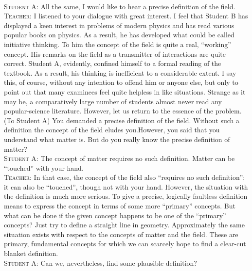 \documentclass[a4paper,sfsidenotes]{tufte-book}
\begin{document}
\\
\textsc{Student A:} All the same, I would like to hear a precise definition of the field.
\\
\textsc{Teacher:} I listened to your dialogue with great interest. I feel that Student B has displayed a keen interest in problems of modern physics and has read various popular books on physics. As a result, he has developed what could be called initiative thinking. To him the concept of the field is quite a real, ``working'' concept. His remarks on the field as a transmitter of interactions are quite correct. Student A, evidently, confined himself to a formal reading of the textbook. As a result, his thinking is inefficient to a considerable extent. I say this, of course, without any intention to offend him or anyone else, but only to point out that many examinees feel quite helpless in like situations. Strange as it may be, a comparatively large number of students almost never read any popular-science literature. However, let us return to the essence of the problem. (To Student A) You demanded a precise definition of the field. Without such a definition the concept of the field eludes you.However, you said that you understand what matter is. But do you really know the precise definition of matter?
\\
\textsc{Student A:} The concept of matter requires no such definition. Matter can be ``touched'' with your hand.
\\
\textsc{Teacher:} In that case, the concept of the field also ``requires no such definition''; it can also be ``touched'', though not with your hand. However, the situation with the definition is much more serious. To give a precise, logically faultless definition means to express the concept in terms of some more ``primary'' concepts. But what can be done if the given concept happens to be one of the ``primary'' concepts? Just try to define a straight line in geometry. Approximately the same situation exists with respect to the concepts of matter and the field. These are primary, fundamental concepts for which we can scarcely hope to find a clear-cut blanket definition.
\\
\textsc{Student A:} Can we, nevertheless, find some plausible definition?
\\
\end{document}
